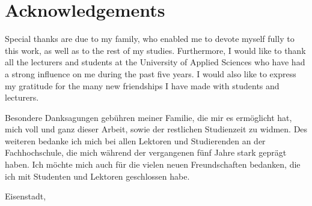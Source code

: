 \thispagestyle{empty}
\chapter{Acknowledgements}


Special thanks are due to my family, who enabled me to devote myself fully to this work, as well as to the rest of my studies.
Furthermore, I would like to thank all the lecturers and students at the University of Applied Sciences who have had a strong influence on me during the past five years.
I would also like to express my gratitude for the many new friendships I have made with students and lecturers.


Besondere Danksagungen gebühren meiner Familie, die mir es ermöglicht hat, mich voll und ganz dieser Arbeit, sowie der restlichen Studienzeit zu widmen.
Des weiteren bedanke ich mich bei allen Lektoren und Studierenden an der Fachhochschule, die mich während der vergangenen fünf Jahre stark geprägt haben.
Ich möchte mich auch für die vielen neuen Freundschaften bedanken, die ich mit Studenten und Lektoren geschlossen habe.




\vspace{2cm} 


\begin{flushleft}
    \yourNameInclTitle 
\end{flushleft}
Eisenstadt, \thesisDate 

\clearpage
